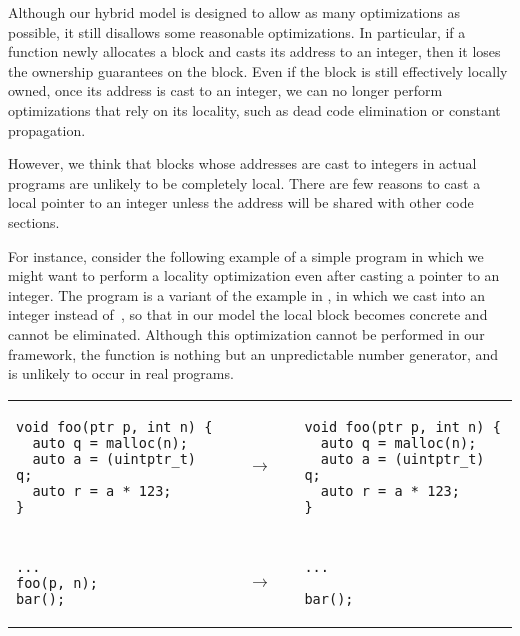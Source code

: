 Although our hybrid model is designed to allow as many optimizations as possible, it still disallows some reasonable optimizations. 
In particular, if a function newly allocates a block and casts its address to an
integer, then it loses the ownership guarantees on the block. 
Even if the block is still effectively locally owned, 
once its address is cast to an integer, we can no longer perform optimizations that rely on its locality, such as dead code elimination or constant propagation. 

However, we think that blocks whose addresses are cast to
integers in actual programs are unlikely to be completely local. There are few reasons to cast a local pointer to an integer unless the address will be shared with other code sections. 

For instance, consider the following example of a simple program in which we might want to perform a locality optimization even after casting a pointer to an integer.
The program is a variant of 
the example in , in which we cast  into an integer instead of~,
so that in our model the local block becomes concrete and cannot be eliminated.
Although this optimization cannot be performed in our framework, the function  is nothing but an %
unpredictable number generator, and is unlikely to occur in real programs.

\begin{center}
\small
\begin{tabular}{@{}l@{}l@{}l@{}}
\begin{minipage}{0.4\textwidth}
\begin{verbatim}
void foo(ptr p, int n) {
  auto q = malloc(n);
  auto a = (uintptr_t) q;
  auto r = a * 123;
}
\end{verbatim}
\end{minipage}
&
$\quad\rightarrow\quad$
&
\begin{minipage}{0.4\textwidth}
\begin{verbatim}
void foo(ptr p, int n) {
  auto q = malloc(n);
  auto a = (uintptr_t) q;
  auto r = a * 123;
}
\end{verbatim}
\end{minipage}
\\
\\
\begin{minipage}{0.4\textwidth}
\begin{verbatim}
...
foo(p, n);
bar();
\end{verbatim}
\end{minipage}
&
$\quad\rightarrow\quad$
&
\begin{minipage}{0.4\textwidth}
\begin{verbatim}
...

bar();
\end{verbatim}
\end{minipage}
\end{tabular}
\end{center}

